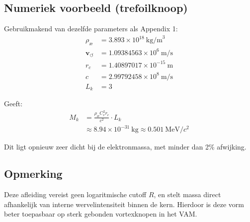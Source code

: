 \subsection*{Numeriek voorbeeld (trefoilknoop)}
Gebruikmakend van dezelfde parameters als Appendix 1:
\begin{align*}
    \rho_\text{\ae} &= 3.893 \times 10^{18}~\text{kg/m}^3 \\
    \mathbf{v}_{\scriptscriptstyle\boldsymbol{\circlearrowleft}} &= 1.09384563 \times 10^6~\text{m/s} \\
    r_c &= 1.40897017 \times 10^{-15}~\text{m} \\
    c &= 2.99792458 \times 10^8~\text{m/s} \\
    L_k &= 3
\end{align*}

Geeft:
\begin{align*}
    M_k &= \frac{\rho_\text{\ae} C_e^2 r_c}{c^2} \cdot L_k \\
    &\approx 8.94 \times 10^{-31}~\text{kg} \approx 0.501~\text{MeV}/c^2
\end{align*}

Dit ligt opnieuw zeer dicht bij de elektronmassa, met minder dan 2\% afwijking.

\subsection*{Opmerking}
Deze afleiding vereist geen logaritmische cutoff \( R \), en stelt massa direct afhankelijk van interne wervelintensiteit binnen de kern. Hierdoor is deze vorm beter toepasbaar op sterk gebonden vortexknopen in het VAM.